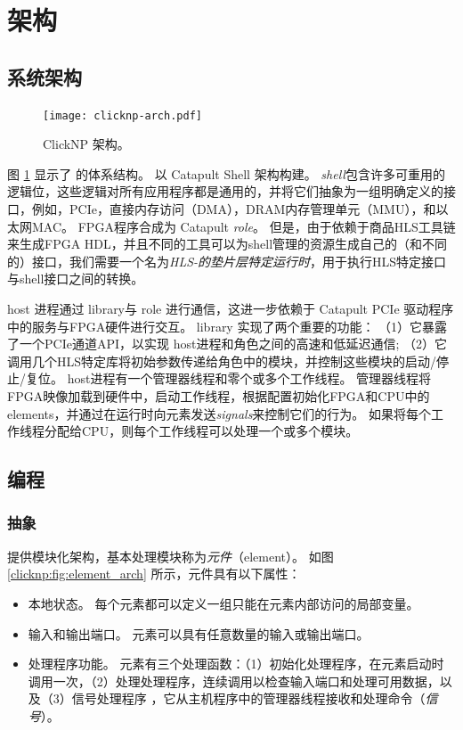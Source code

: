 \section{架构}
\label{clicknp:sec:architecture}

\subsection{系统架构}
\label{clicknp:subsec:sysarch}

\begin{figure}
\centering
\texttt{[image: clicknp-arch.pdf]}
\caption{ClickNP 架构。}
\label{clicknp:fig:clicknp}
\end{figure}

图 \ref{clicknp:fig:clicknp} 显示了 \name 的体系结构。
\name 以 Catapult Shell 架构构建\cite {putnam2014reconfigurable}。
\textit {shell}包含许多可重用的逻辑位，这些逻辑对所有应用程序都是通用的，并将它们抽象为一组明确定义的接口，例如，PCIe，直接内存访问（DMA），DRAM内存管理单元（MMU），和以太网MAC。
\name FPGA程序合成为 Catapult \textit {role}。
但是，由于\name 依赖于商品HLS工具链来生成FPGA HDL，并且不同的工具可以为shell管理的资源生成自己的（和不同的）接口，我们需要一个名为\textit {HLS-的垫片层特定运行时}，用于执行HLS特定接口与shell接口之间的转换。

\name{} host 进程通过 \name{} library与 \name{} role 进行通信，这进一步依赖于 Catapult PCIe 驱动程序中的服务与FPGA硬件进行交互。
\name{} library 实现了两个重要的功能：
（1）它暴露了一个PCIe通道API，以实现 \name{} host进程和角色之间的高速和低延迟通信;
（2）它调用几个HLS特定库将初始参数传递给角色中的模块，并控制这些模块的启动/停止/复位。
\name{} host进程有一个管理器线程和零个或多个工作线程。
管理器线程将FPGA映像加载到硬件中，启动工作线程，根据配置初始化FPGA和CPU中的\name elements，并通过在运行时向元素发送\textit {signals}来控制它们的行为。
如果将每个工作线程分配给CPU，则每个工作线程可以处理一个或多个模块。

\subsection{\name 编程}

\subsubsection{抽象}

\name 提供模块化架构，基本处理模块称为\textit{元件}（element）。
如图 \ref{clicknp:fig:element_arch} 所示，\name 元件具有以下属性：
\begin{itemize}
\item 本地状态。 每个元素都可以定义一组只能在元素内部访问的局部变量。
\item 输入和输出端口。 元素可以具有任意数量的输入或输出端口。
\item 处理程序功能。 元素有三个处理函数：（1）初始化处理程序，在元素启动时调用一次，（2）处理处理程序，连续调用以检查输入端口和处理可用数据，以及（3）信号处理程序 ，它从主机程序中的管理器线程接收和处理命令（\textit {信号}）。
\end{itemize}

